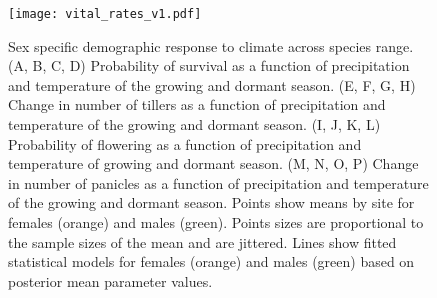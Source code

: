\documentclass[9pt,twocolumn,twoside,lineno]{pnas-new}
\begin{document}
\begin{figure}[H]
\centering
\texttt{[image: vital\_rates\_v1.pdf]}
\caption{Sex specific demographic response to climate across species range.
			(A, B, C, D) Probability of survival as a function of precipitation and temperature of the growing and dormant season.
			(E, F, G, H) Change in number of tillers as a function of precipitation and temperature of the growing and dormant season.
			(I, J, K, L) Probability of flowering as a function of precipitation and temperature of growing and dormant season.
			(M, N, O, P) Change in number of panicles as a function of precipitation and temperature of the growing and dormant season.
			Points show means by site for females (orange) and males (green). 
			Points sizes are proportional to the sample sizes of the mean and are jittered.
			Lines show fitted statistical models for females (orange) and males (green) based on posterior mean parameter values.
			}
\label{fig:vital_rates}
\end{figure}
\clearpage
\end{document}
